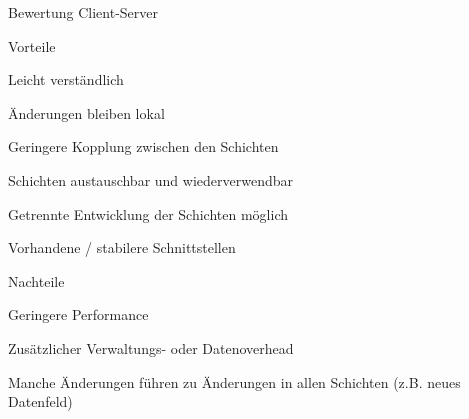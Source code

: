 \documentclass[a4paper]{article}
\begin{document}
\begin{multicols}{3}
  Bewertung Client-Server
  \begin{itemize*}
    \item Vorteile
          \begin{itemize*}
            \item Leicht verständlich
            \item Änderungen bleiben lokal
            \item Geringere Kopplung zwischen den Schichten
            \item Schichten austauschbar und wiederverwendbar
            \item Getrennte Entwicklung der Schichten möglich
            \item Vorhandene / stabilere Schnittstellen
          \end{itemize*}
    \item Nachteile
          \begin{itemize*}
            \item Geringere Performance
            \item Zusätzlicher Verwaltungs- oder Datenoverhead
            \item Manche Änderungen führen zu Änderungen in allen Schichten (z.B. neues Datenfeld)
          \end{itemize*}
  \end{itemize*}


\end{multicols}
\end{document}
